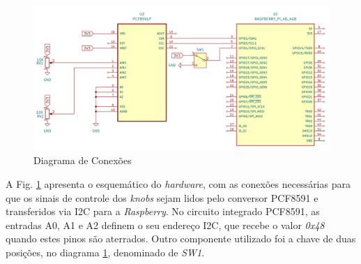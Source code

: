 
\begin{figure}[h]
    \centering
    \includegraphics[width=1\textwidth]{figuras/fig80.png}
    \caption{Diagrama de Conexões}
    \label{fig80}
\end{figure}

A Fig. \ref{fig80} apresenta o esquemático do \textit{hardware}, com as conexões necessárias para que os sinais de controle dos \textit{knobs} sejam lidos pelo conversor PCF8591 e transferidos via I2C para a \textit{Raspberry}.
No circuito integrado PCF8591, as entradas A0, A1 e A2 definem o seu endereço I2C, que recebe o valor \textit{0x48} quando estes pinos são aterrados.
Outro componente utilizado foi a chave de duas posições, no diagrama \ref{fig80}, denominado de \textit{SW1}. %

